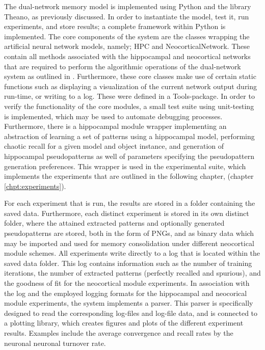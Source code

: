 The dual-network memory model is implemented using Python and the library Theano, as previously discussed. In order to instantiate the model, test it, run experiments, and store results; a complete framework within Python is implemented. The core components of the system are the classes wrapping the artificial neural network models, namely; HPC and NeocorticalNetwork. These contain all methods associated with the hippocampal and neocortical networks that are required to perform the algorithmic operations of the dual-network system as outlined in \citep{Hattori2014}. Furthermore, these core classes make use of certain static functions such as displaying a visualization of the current network output during run-time, or writing to a log. These were defined in a Tools-package. In order to verify the functionality of the core modules, a small test suite using unit-testing is implemented, which may be used to automate debugging processes. 
Furthermore, there is a hippocampal module wrapper implementing an abstraction of learning a set of patterns using a hippocampal model, performing chaotic recall for a given model and object instance, and generation of hippocampal pseudopatterns as well of parameters specifying the pseudopattern generation preferences. This wrapper is used in the experimental suite, which implements the experiments that are outlined in the following chapter, (chapter \ref{chpt:experiments}). 

For each experiment that is run, the results are stored in a folder containing the saved data. Furthermore, each distinct experiment is stored in its own distinct folder, where the attained extracted patterns and optionally generated pseudopatterns are stored, both in the form of PNGs, and as binary data which may be imported and used for memory consolidation under different neocortical module schemes. 
All experiments write directly to a log that is located within the saved data folder. This log contains information such as the number of training iterations, the number of extracted patterns (perfectly recalled and spurious), and the goodness of fit for the neocortical module experiments. 
In association with the log and the employed logging formats for the hippocampal and neocorical module experiments, the system implements a parser. This parser is specifically designed to read the corresponding log-files and log-file data, and is connected to a plotting library, which creates figures and plots of the different experiment results. Examples include the average convergence and recall rates by the neuronal neuronal turnover rate.

